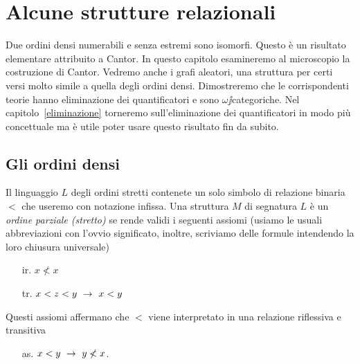 \chapter{Alcune strutture relazionali}
\label{relazionali}

\def\ceq#1#2#3{\parbox{20ex}{$\displaystyle #1$}\parbox{4ex}{\hfil$#2$}$\displaystyle #3$}




Due ordini densi numerabili e senza estremi sono isomorfi. Questo \`e un risultato elementare attribuito a Cantor. In questo capitolo esamineremo al microscopio la costruzione di Cantor. Vedremo anche i grafi aleatori, una struttura per certi versi molto simile a quella degli ordini densi.  Dimostreremo che le corrispondenti teorie hanno eliminazione dei quantificatori e sono $\omega\jj$categoriche. Nel capitolo~\ref{eliminazione} torneremo sull'eliminazione dei quantificatori in modo pi\`u concettuale ma \`e utile poter usare questo risultato fin da subito. 

\section{Gli ordini densi}
\label{ordinilinearidensi}
Il linguaggio $L$ degli ordini stretti contenete un solo simbolo di relazione binaria $<$ che useremo con notazione infissa. Una struttura $M$ di segnatura $L$ \`e un \emph{ordine parziale (stretto)} se rende validi i seguenti assiomi (usiamo le usuali abbreviazioni con l'ovvio significato, inoltre, scriviamo delle formule intendendo la loro chiusura universale)

\begin{itemize}
\item[ir.] $x \not< x$
\item[tr.] $x< z< y\ \rightarrow\ x< y$
\end{itemize}

Questi assiomi affermano che  $<$ viene interpretato in una relazione riflessiva e transitiva
\begin{itemize}
\item[as.] $x<y\ \rightarrow\ y\not<x$.
\end{itemize}

